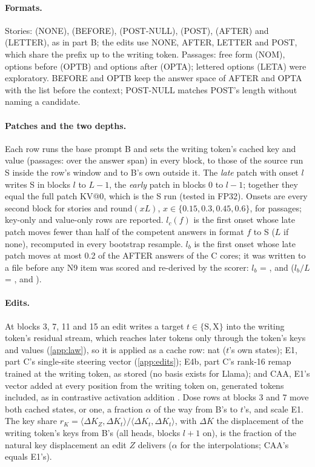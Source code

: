 \paragraph{Formats.} Stories: \fmtNone{} (NONE), \fmtBefore{} (BEFORE), \fmtNull{} (POST-NULL), \fmtPost{} (POST), \fmtListA{} (AFTER) and \fmtLetter{} (LETTER), as in part B; the edits use NONE, AFTER, LETTER and POST, which share the prefix up to the writing token. Passages: free form (NOM), options before (OPTB) and options after (OPTA); lettered options (LETA) were exploratory. BEFORE and OPTB keep the answer space of AFTER and OPTA with the list before the context; POST-NULL matches POST's length without naming a candidate.

\paragraph{Patches and the two depths.} Each row runs the base prompt B and sets the writing token's cached key and value (passages: over the answer span) in every block, to those of the source run S inside the row's window and to B's own outside it. The \emph{late} patch with onset $l$ writes S in blocks $l$ to $L-1$, the \emph{early} patch in blocks 0 to $l-1$; together they equal the full patch KV@0, which is the S run (tested in FP32). Onsets are every second block for stories and $\mathrm{round}(xL)$, $x \in \{0.15, 0.3, 0.45, 0.6\}$, for passages; key-only and value-only rows are reported. $l_c(f)$ is the first onset whose late patch moves fewer than half of the competent answers in format $f$ to S ($L$ if none), recomputed in every bootstrap resample. $l_b$ is the first onset whose late patch moves at most 0.2 of the AFTER answers of the C cores; it was written to a file before any N9 item was scored and re-derived by the scorer: $l_b$ = \NqLbMistralSeven{}, \NqLbLlamaEight{} and \NqLbQwenSeven{} ($l_b/L$ = \NqLbFracMistralSeven{}, \NqLbFracLlamaEight{} and \NqLbFracQwenSeven{}).

\paragraph{Edits.} At blocks 3, 7, 11 and 15 an edit writes a target $t \in \{\mathrm{S}, \mathrm{X}\}$ into the writing token's residual stream, which reaches later tokens only through the token's keys and values (\cref{app:law}), so it is applied as a cache row: nat ($t$'s own states); E1, part C's single-site steering vector (\cref{app:edits}); E4b, part C's rank-16 remap trained at the writing token, as stored (no basis exists for Llama); and CAA, E1's vector added at every position from the writing token on, generated tokens included, as in contrastive activation addition \citep{panickssery2023caa}. Dose rows at blocks 3 and 7 move both cached states, or one, a fraction $\alpha$ of the way from B's to $t$'s, and scale E1. The key share $r_K = \langle \Delta K_Z, \Delta K_t\rangle / \langle \Delta K_t, \Delta K_t\rangle$, with $\Delta K$ the displacement of the writing token's keys from B's (all heads, blocks $l{+}1$ on), is the fraction of the natural key displacement an edit $Z$ delivers ($\alpha$ for the interpolations; CAA's equals E1's).


